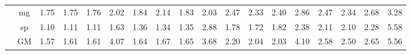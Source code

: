 \begin{table*}[]
\begin{center}
{\begin{tabular}{|c|c|rrrr|rrrr|rrrr|rrrr|}
 &  mg  &  1.75  &  1.75  &  1.76  &   2.02  &  1.84  &  2.14  & \cellcolor{blue!25} 1.83  &   2.03  &  2.47  & \cellcolor{blue!25} 2.33  &  2.40  &   2.86  &  2.47  & \cellcolor{blue!25} 2.34  &  2.68  &   3.28 \\
 &  sp  &  1.10  &  1.11  &  1.11  &   1.63  &  1.36  & \cellcolor{blue!25} 1.34  &  1.35  &   2.88  &  1.78  & \cellcolor{blue!25} 1.72  &  1.82  &   2.38  &  2.11  & \cellcolor{blue!25} 2.10  &  2.28  &   5.58 \\
 &  GM  &  1.57  &  1.61  &  1.61  &   4.07  &  1.64  &  1.67  & \cellcolor{blue!25} 1.65  &   3.68  &  2.20  & \cellcolor{blue!25} 2.04  & \cellcolor{blue!25} 2.03  &   4.10  &  2.58  & \cellcolor{blue!25} 2.50  &  2.65  &   5.56 \\
\hline 
\end{tabular} }

\end{center}
\end{table*}
